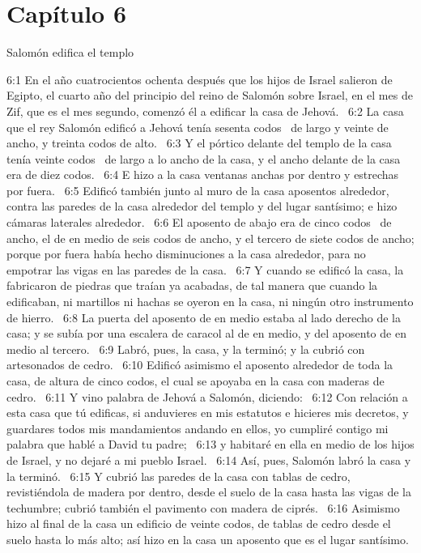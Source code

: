 \section*{Capítulo 6}
Salomón edifica el templo  


6:1 En el año cuatrocientos ochenta después que los hijos de Israel salieron de Egipto, el cuarto año del principio del reino de Salomón sobre Israel, en el mes de Zif, que es el mes segundo, comenzó él a edificar la casa de Jehová.  
6:2 La casa que el rey Salomón edificó a Jehová tenía sesenta codos  de largo y veinte de ancho, y treinta codos de alto.  
6:3 Y el pórtico delante del templo de la casa tenía veinte codos  de largo a lo ancho de la casa, y el ancho delante de la casa era de diez codos.  
6:4 E hizo a la casa ventanas anchas por dentro y estrechas por fuera.  
6:5 Edificó también junto al muro de la casa aposentos alrededor, contra las paredes de la casa alrededor del templo y del lugar santísimo; e hizo cámaras laterales alrededor.  
6:6 El aposento de abajo era de cinco codos  de ancho, el de en medio de seis codos de ancho, y el tercero de siete codos de ancho; porque por fuera había hecho disminuciones a la casa alrededor, para no empotrar las vigas en las paredes de la casa.  
6:7 Y cuando se edificó la casa, la fabricaron de piedras que traían ya acabadas, de tal manera que cuando la edificaban, ni martillos ni hachas se oyeron en la casa, ni ningún otro instrumento de hierro.  
6:8 La puerta del aposento de en medio estaba al lado derecho de la casa; y se subía por una escalera de caracol al de en medio, y del aposento de en medio al tercero.  
6:9 Labró, pues, la casa, y la terminó; y la cubrió con artesonados de cedro.  
6:10 Edificó asimismo el aposento alrededor de toda la casa, de altura de cinco codos, el cual se apoyaba en la casa con maderas de cedro.  
6:11 Y vino palabra de Jehová a Salomón, diciendo:  
6:12 Con relación a esta casa que tú edificas, si anduvieres en mis estatutos e hicieres mis decretos, y guardares todos mis mandamientos andando en ellos, yo cumpliré contigo mi palabra que hablé a David tu padre;  
6:13 y habitaré en ella en medio de los hijos de Israel, y no dejaré a mi pueblo Israel.  
6:14 Así, pues, Salomón labró la casa y la terminó.  
6:15 Y cubrió las paredes de la casa con tablas de cedro, revistiéndola de madera por dentro, desde el suelo de la casa hasta las vigas de la techumbre; cubrió también el pavimento con madera de ciprés.  
6:16 Asimismo hizo al final de la casa un edificio de veinte codos, de tablas de cedro desde el suelo hasta lo más alto; así hizo en la casa un aposento que es el lugar santísimo. 
